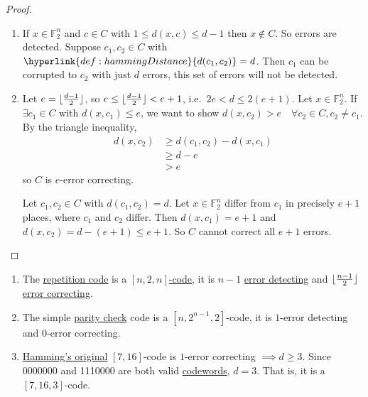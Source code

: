 \documentclass{article}
\DeclarePairedDelimiter{\floor}{\lfloor}{\rfloor}
\newcommand{\1}[1]{\mathbbm{1}_{#1}}
\begin{document}
\begin{proof}\leavevmode
    \begin{enumerate}[label=(\roman*)]
        \item If $x \in \mathbb{F}_2^n$ and $c \in C$ with $1 \leq d(x, c) \leq d-1$ then $x \notin C$. So errors are detected.
            Suppose $c_1, c_2 \in C$ with $\hyperlink{def:hammingDistance}{d(c_1, c_2)} = d$.
            Then $c_1$ can be corrupted to $c_2$ with just $d$ errors, this set of errors will not be detected.
        \item Let $e = \floor{\frac{d-1}{2}}$, so $e \leq \floor{\frac{d-1}{2}} < e+1$, i.e.\ $2e < d \leq 2(e+1)$.
            Let $x \in \mathbb{F}_2^n$. If $\exists c_1 \in C$ with $d(x, c_1) \leq e$, we want to show $d(x, c_2) > e \quad \forall c_2 \in C, c_2 \neq c_1$.
            By the triangle inequality,
            \begin{align*}
                d(x, c_2) &\geq d(c_1, c_2) - d(x, c_1) \\
                          &\geq d - e \\
                          &> e
            \end{align*}
            so $C$ is $e$-error correcting.

            Let $c_1, c_2 \in C$ with $d(c_1, c_2) = d$. Let $x \in \mathbb{F}_2^n$ differ from $c_1$ in precisely $e+1$ places, where $c_1$ and $c_2$ differ.
            Then $d(x, c_1) = e+1$ and $d(x, c_2) = d - (e+1) \leq e+1$.
            So $C$ cannot correct all $e+1$ errors.
    \end{enumerate}
\end{proof}
\begin{eg}
    \leavevmode
    \begin{enumerate}[label=\arabic*)]
        \item The \hyperlink{def:repetitionCode}{repetition code} is a \hyperlink{def:nmdCode}{$[n, 2, n]$-code}, it is $n-1$ \hyperlink{def:errorDet}{error detecting} and $\floor{\frac{n-1}{2}}$ \hyperlink{def:errorCor}{error correcting}.
        \item The simple \hyperlink{def:parityCheckCode}{parity check} code is a $[n, 2^{n-1}, 2]$-code, it is $1$-error detecting and $0$-error correcting.
        \item \hyperlink{def:hammingCode}{Hamming's original} $[7, 16]$-code is $1$-error correcting $\implies d \geq 3$. Since 0000000 and 1110000 are both valid \hyperlink{def:binaryCode}{codewords}, $d=3$. That is, it is a $[7, 16, 3]$-code.
    \end{enumerate}
\end{eg}
\end{document}
